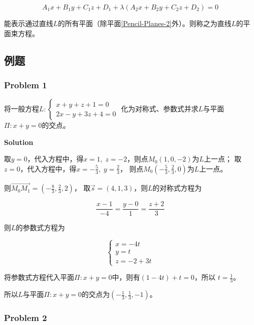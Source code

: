 \documentclass[
	11pt, %
	a4paper, %
]{WhuSakuraBook}
\begin{document}
    \begin{equation}
        A_1 x+B_1 y+C_1 z+D_1+\lambda\left(A_2x+B_2y+C_2z+D_2\right) = 0
    \end{equation}

    能表示通过直线\(L\)的所有平面（除平面\ref{Pencil-Planes-2}外）。则称之为直线\(L\)的平面束方程。

\subsection{例题}

\subsubsection*{Problem 1}

    将一般方程$L:\left\{\begin{array}{l}x+y+z+1=0 \\ 2 x-y+3z+4=0\end{array}\right.$
    化为对称式、参数式并求\(L\)与平面\(\Pi: x + y =0\)的交点。
    \vspace{1em}

    \textbf{Solution}
    \vspace{1em}

    取\(y = 0\)，代入方程中，得\(x=1,\; z=-2\)，则点\(M_{0}\left(1,0,-2\right)\)为\(L\)上一点；
    取\(z = 0\)，代入方程中，得\(x=-\frac{5}{3},\; y=\frac{2}{3}\)，
    则点\(M_{0}\left(-\frac{5}{3},\frac{2}{3},0\right)\)为\(L\)上一点。

    则\(\overrightarrow{M_{0}M_{1}} = \left(-\frac{8}{3},\frac{2}{3},2\right)\)，
    取\(\overrightarrow{s} = \left(4,1,3\right)\)，则\(L\)的对称式方程为

    \[
        \frac{x-1}{-4}=\frac{y-0}{1}=\frac{z+2}{3}
    \]

    则\(L\)的参数式方程为

    $$
        \left\{\begin{array}{l}
        x=-4 t \\
        y=t \\
        z=-2+3 t
        \end{array}\right.
    $$

    将参数式方程代入平面\(\Pi: x + y =0\)中，则有\(\left(1-4t\right) + t = 0\)，所以
    \(t = \frac{1}{3}\)。

    所以\(L\)与平面\(\Pi: x + y =0\)的交点为\(\left(-\frac{1}{3},\frac{1}{3},-1\right)\)。

\subsubsection*{Problem 2}
\end{document}
